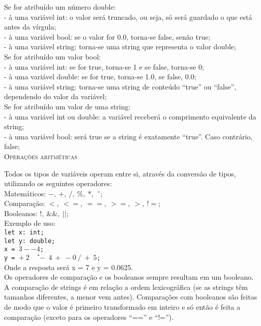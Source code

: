 \documentclass[12pt,a4paper]{article}
\begin{document}
Se for atribuído um número double:\\[0.15cm]
- à uma variável int: o valor será truncado, ou seja, só será guardado o que está antes da vírgula;\\
- à uma variável bool: se o valor for 0.0, torna-se false, senão true;\\
- à uma variável string: torna-se uma string que representa o valor double;\\[0.3cm]

Se for atribuído um valor bool:\\[0.15cm]
- à uma variável int: se for true, torna-se 1 e se false, torna-se 0;\\
- à uma variável double: se for true, torna-se 1.0, se false, 0.0;\\
- à uma variável string: torna-se uma string de conteúdo ``true'' ou ``false'', dependendo do valor da variável;\\[0.3cm]

Se for atribuído um valor de uma string:\\[0.15cm]
- à uma variável int ou double: a variável receberá o comprimento equivalente da string;\\
- à uma variável bool: será true se a string é exatamente ``true''. Caso contrário, false;\\[0.3cm]

\hypertarget{label3}{\Large{\textsc{Operações aritméticas}}}\\
\normalsize

Todos os tipos de variáveis operam entre si, através da conversão de tipos, utilizando os seguintes operadores:\\[0.2cm]
Matemáticos: $-,\ +,\ /,\ \%,\ *,$ \^\ ;\\
Comparação: $<,\ <=,\ ==,\ >=,\ >,\ !=$;\\
Booleanos: $!,\ \&\&,\ ||$;\\[0.6cm]
Exemplo de uso:\\[0.3cm]
\texttt{\indent let x: int;\\
\indent let y: double;\\
\indent x = $3--4$;\\
\indent y = $+\ 2$ \^\ $\ -\ 4\ +\ -0\ /\ +\ 5$;}\\[0.5cm]
Onde a resposta será x = 7 e y = 0.0625.\\


Os operadores de comparação e os booleanos sempre resultam em um booleano. A comparação de strings é em relação a ordem lexicográfica (se as strings têm tamanhos diferentes, a menor vem antes). Comparações com booleanos são feitas de modo que o valor é primeiro transformado em inteiro e só então é feita a comparação (exceto para os operadores ``=='' e ``!='').\\
\end{document}
